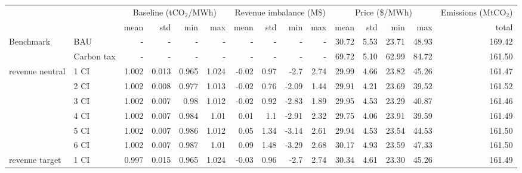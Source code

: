 \begin{tabular}{ll*{13}{r}}
\toprule
              &      & \multicolumn{4}{c}{Baseline (tCO$_{2}$/MWh)} & \multicolumn{4}{c}{Revenue imbalance (M\$)} & \multicolumn{4}{c}{Price (\$/MWh)} & Emissions (MtCO$_{2}$) \\
              &      &                     mean &    std &    min &    max &                    mean &    std &    min &   max &           mean &   std &    min &    max &                  total \\
\midrule
Benchmark & BAU &                        - &      - &      - &      - &                       - &      - &      - &     - &          30.72 &  5.53 &  23.71 &  48.93 &                 169.42 \\
              & Carbon tax &                        - &      - &      - &      - &                       - &      - &      - &     - &          69.72 &  5.10 &  62.99 &  84.72 &                 161.50 \\
revenue neutral & 1 CI &                    1.002 &  0.013 &  0.965 &  1.024 &                   -0.02 &   0.97 &   -2.7 &  2.74 &          29.99 &  4.66 &  23.82 &  45.26 &                 161.47 \\
              & 2 CI &                    1.002 &  0.008 &  0.977 &  1.013 &                   -0.02 &   0.76 &  -2.09 &  1.44 &          29.91 &  4.21 &  23.69 &  39.52 &                 161.52 \\
              & 3 CI &                    1.002 &  0.007 &   0.98 &  1.012 &                   -0.02 &   0.92 &  -2.83 &  1.89 &          29.95 &  4.53 &  23.29 &  40.87 &                 161.46 \\
              & 4 CI &                    1.002 &  0.007 &  0.984 &   1.01 &                    0.01 &    1.1 &  -2.91 &  2.32 &          29.75 &  4.06 &  23.91 &  39.59 &                 161.49 \\
              & 5 CI &                    1.002 &  0.007 &  0.986 &  1.012 &                    0.05 &   1.34 &  -3.14 &  2.61 &          29.94 &  4.53 &  23.54 &  44.53 &                 161.50 \\
              & 6 CI &                    1.002 &  0.007 &  0.987 &   1.01 &                    0.09 &   1.48 &  -3.29 &  2.68 &          30.17 &  4.93 &  23.59 &  47.33 &                 161.50 \\
revenue target & 1 CI &                    0.997 &  0.015 &  0.965 &  1.024 &                   -0.03 &   0.96 &   -2.7 &  2.74 &          30.34 &  4.61 &  23.30 &  45.26 &                 161.49 \\

\end{tabular}
